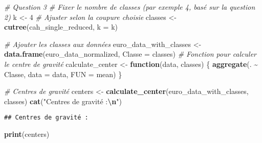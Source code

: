 \documentclass[
]{article}
\newenvironment{Shaded}{\begin{snugshade}}{\end{snugshade}}
\newcommand{\AttributeTok}[1]{\textcolor[rgb]{0.13,0.29,0.53}{#1}}
\newcommand{\CommentTok}[1]{\textcolor[rgb]{0.56,0.35,0.01}{\textit{#1}}}
\newcommand{\ControlFlowTok}[1]{\textcolor[rgb]{0.13,0.29,0.53}{\textbf{#1}}}
\newcommand{\DecValTok}[1]{\textcolor[rgb]{0.00,0.00,0.81}{#1}}
\newcommand{\FunctionTok}[1]{\textcolor[rgb]{0.13,0.29,0.53}{\textbf{#1}}}
\newcommand{\NormalTok}[1]{#1}
\newcommand{\OtherTok}[1]{\textcolor[rgb]{0.56,0.35,0.01}{#1}}
\newcommand{\SpecialCharTok}[1]{\textcolor[rgb]{0.81,0.36,0.00}{\textbf{#1}}}
\newcommand{\StringTok}[1]{\textcolor[rgb]{0.31,0.60,0.02}{#1}}
\begin{document}
\begin{Shaded}
\begin{Highlighting}[]
\CommentTok{\# Question 3 }
\CommentTok{\# Fixer le nombre de classes (par exemple 4, basé sur la question 2)}
\NormalTok{k }\OtherTok{\textless{}{-}} \DecValTok{4}  \CommentTok{\# Ajuster selon la coupure choisie}
\NormalTok{classes }\OtherTok{\textless{}{-}} \FunctionTok{cutree}\NormalTok{(cah\_single\_reduced, }\AttributeTok{k =}\NormalTok{ k)}

\CommentTok{\# Ajouter les classes aux données}
\NormalTok{euro\_data\_with\_classes }\OtherTok{\textless{}{-}} \FunctionTok{data.frame}\NormalTok{(euro\_data\_normalized, }\AttributeTok{Classe =}\NormalTok{ classes)}
\CommentTok{\# Fonction pour calculer le centre de gravité}
\NormalTok{calculate\_center }\OtherTok{\textless{}{-}} \ControlFlowTok{function}\NormalTok{(data, classes) \{}
  \FunctionTok{aggregate}\NormalTok{(. }\SpecialCharTok{\textasciitilde{}}\NormalTok{ Classe, }\AttributeTok{data =}\NormalTok{ data, }\AttributeTok{FUN =}\NormalTok{ mean)}
\NormalTok{\}}

\CommentTok{\# Centres de gravité}
\NormalTok{centers }\OtherTok{\textless{}{-}} \FunctionTok{calculate\_center}\NormalTok{(euro\_data\_with\_classes, classes)}
\FunctionTok{cat}\NormalTok{(}\StringTok{"Centres de gravité :}\SpecialCharTok{\textbackslash{}n}\StringTok{"}\NormalTok{)}
\end{Highlighting}
\end{Shaded}

\begin{verbatim}
## Centres de gravité :
\end{verbatim}

\begin{Shaded}
\begin{Highlighting}[]
\FunctionTok{print}\NormalTok{(centers)}
\end{Highlighting}
\end{Shaded}
\end{document}
